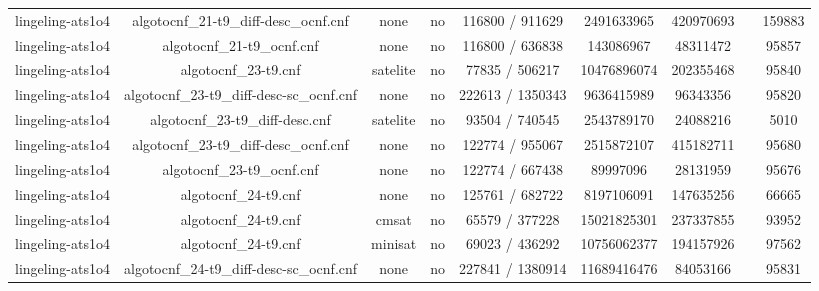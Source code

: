 \begin{appendices}
\begin{table}[p]
\begin{center}
\begin{tabular}{l|cccccccc}
  lingeling-ats1o4               & algotocnf\_21-t9\_diff-desc\_ocnf.cnf & none       & no    & 116800 / 911629 & 2491633965 & 420970693 &            & 159883 \\ %
  lingeling-ats1o4               & algotocnf\_21-t9\_ocnf.cnf     & none       & no    & 116800 / 636838 & 143086967 & 48311472  &            & 95857 \\ %
  lingeling-ats1o4               & algotocnf\_23-t9.cnf           & satelite   & no    & 77835 / 506217 & 10476896074 & 202355468 &            & 95840 \\ %
  lingeling-ats1o4               & algotocnf\_23-t9\_diff-desc-sc\_ocnf.cnf & none       & no    & 222613 / 1350343 & 9636415989 & 96343356  &            & 95820 \\ %
  lingeling-ats1o4               & algotocnf\_23-t9\_diff-desc.cnf & satelite   & no    & 93504 / 740545 & 2543789170 & 24088216  &            & 5010 \\ %
  lingeling-ats1o4               & algotocnf\_23-t9\_diff-desc\_ocnf.cnf & none       & no    & 122774 / 955067 & 2515872107 & 415182711 &            & 95680 \\ %
  lingeling-ats1o4               & algotocnf\_23-t9\_ocnf.cnf     & none       & no    & 122774 / 667438 & 89997096  & 28131959  &            & 95676 \\ %
  lingeling-ats1o4               & algotocnf\_24-t9.cnf           & none       & no    & 125761 / 682722 & 8197106091 & 147635256 &            & 66665 \\ %
  lingeling-ats1o4               & algotocnf\_24-t9.cnf           & cmsat      & no    & 65579 / 377228 & 15021825301 & 237337855 &            & 93952 \\ %
  lingeling-ats1o4               & algotocnf\_24-t9.cnf           & minisat    & no    & 69023 / 436292 & 10756062377 & 194157926 &            & 97562 \\ %
  lingeling-ats1o4               & algotocnf\_24-t9\_diff-desc-sc\_ocnf.cnf & none       & no    & 227841 / 1380914 & 11689416476 & 84053166  &            & 95831 \\ %

\end{tabular}
\end{center}
\end{table}
\end{appendices}
